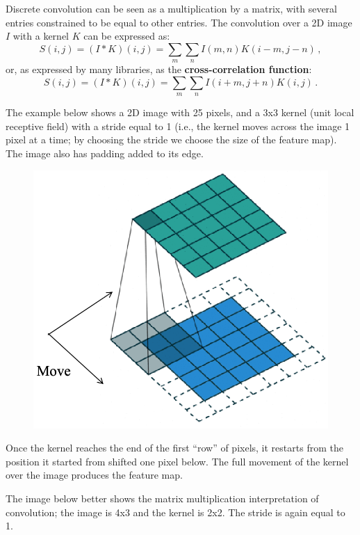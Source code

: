 Discrete convolution can be seen as a multiplication by a matrix, with several entries constrained to be equal to other entries. The convolution over a 2D image $I$ with a kernel $K$ can be expressed as:
\begin{equation*}
    S(i,j) = (I*K)(i,j) = \sum_m \sum_n I(m,n)K(i-m, j-n) \,,
\end{equation*}
or, as expressed by many libraries, as the \textbf{cross-correlation function}:
\begin{equation*}
    S(i,j) = (I*K)(i,j) = \sum_m \sum_n I(i+m,j+n)K(i, j) \,.
\end{equation*}

The example below shows a 2D image with 25 pixels, and a 3x3 kernel (unit local receptive field) with a stride equal to 1 (i.e., the kernel moves across the image 1 pixel at a time; by choosing the stride we choose the size of the feature map). The image also has padding added to its edge.
\begin{figure}[h]
    \centering
    \includegraphics[width=0.6\linewidth]{img/CNN_2D.png} 
\end{figure}

Once the kernel reaches the end of the first ``row'' of pixels, it restarts from the position it started from shifted one pixel below. The full movement of the kernel over the image produces the feature map.

The image below better shows the matrix multiplication interpretation of convolution; the image is 4x3 and the kernel is 2x2. The stride is again equal to 1.

